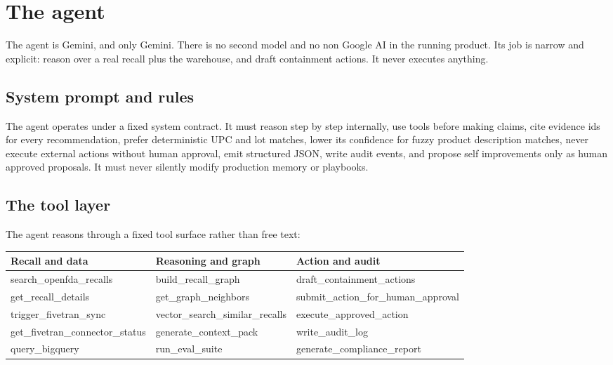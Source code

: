 \documentclass[11pt]{article}
\begin{document}
\section{The agent}

The agent is Gemini, and only Gemini. There is no second model and no non Google AI in the running
product. Its job is narrow and explicit: reason over a real recall plus the warehouse, and draft
containment actions. It never executes anything.

\subsection{System prompt and rules}

The agent operates under a fixed system contract. It must reason step by step internally, use tools
before making claims, cite evidence ids for every recommendation, prefer deterministic UPC and lot
matches, lower its confidence for fuzzy product description matches, never execute external actions
without human approval, emit structured JSON, write audit events, and propose self improvements
only as human approved proposals. It must never silently modify production memory or playbooks.

\subsection{The tool layer}

The agent reasons through a fixed tool surface rather than free text:

\begin{center}
\footnotesize\setlength{\tabcolsep}{4pt}
\renewcommand{\arraystretch}{1.25}
\begin{tabularx}{\textwidth}{@{}XXX@{}}
\toprule
Recall and data & Reasoning and graph & Action and audit \\
\midrule
search\_openfda\_recalls & build\_recall\_graph & draft\_containment\_actions \\
get\_recall\_details & get\_graph\_neighbors & submit\_action\_for\_human\_approval \\
trigger\_fivetran\_sync & vector\_search\_similar\_recalls & execute\_approved\_action \\
get\_fivetran\_connector\_status & generate\_context\_pack & write\_audit\_log \\
query\_bigquery & run\_eval\_suite & generate\_compliance\_report \\
\bottomrule
\end{tabularx}
\end{center}
\end{document}
